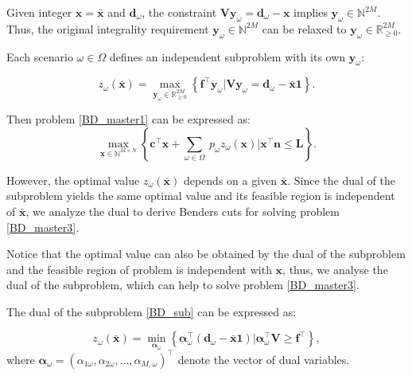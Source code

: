 Given integer $\mathbf{x} = \mathbf{\bar{x}}$ and $\mathbf{d}_{\omega}$, the constraint $\mathbf{V} \mathbf{y}_{\omega} = \mathbf{d}_{\omega} -\mathbf{x}$ implies $\mathbf{y}_{\omega} \in \mathbb{N}^{2M}$. Thus, the original integrality requirement $\mathbf{y}_{\omega} \in \mathbb{N}^{2M}$ can be relaxed to $\mathbf{y}_{\omega} \in \mathbb{R}^{2M}_{\scriptscriptstyle \geq 0}$.

Each scenario $\omega \in \Omega$ defines an independent subproblem with its own $\mathbf{y}_{\omega}$:

\begin{equation}\label{BD_sub}
  z_{\omega}(\mathbf{\bar{x}}) = \max_{\mathbf{y}_{\omega} \in \mathbb{R}^{2M}_{\scriptscriptstyle \geq 0}} \left\{
  \mathbf{f}^{\intercal} \mathbf{y}_{\omega}\Big| \mathbf{V} \mathbf{y}_{\omega} = \mathbf{d}_{\omega} - \mathbf{\bar{x}} \mathbf{1}
  \right\}.
\end{equation}

Then problem \eqref{BD_master1} can be expressed as:
\begin{equation}\label{BD_master3}
  \max_{\mathbf{x} \in \mathbb{N}^{M \times N}} \left\{ \mathbf{c}^{\intercal} \mathbf{x} + \sum_{\omega \in \Omega} ~ p_{\omega} z_{\omega}(\mathbf{x}) \bigg| \mathbf{x}^{\intercal} \mathbf{n} \leq \mathbf{L} \right\}.
\end{equation}


However, the optimal value $z_{\omega}(\mathbf{\bar{x}})$ depends on a given $\mathbf{\bar{x}}$. Since the dual of the subproblem yields the same optimal value and its feasible region is independent of $\mathbf{\bar{x}}$, we analyze the dual to derive Benders cuts for solving problem \eqref{BD_master3}.


Notice that the optimal value can also be obtained by the dual of the subproblem and the feasible region of problem is independent with $\mathbf{x}$, thus, we analyse the dual of the subproblem, which can help to solve problem \eqref{BD_master3}.


The dual of the subproblem \eqref{BD_sub} can be expressed as:

\begin{equation}\label{BD_sub_dual}
  z_{\omega}(\mathbf{\bar{x}}) = \min_{\bm{\alpha}_{\omega}} \left\{
    \bm{\alpha}_{\omega}^{\intercal} (\mathbf{d}_{\omega}- \mathbf{\bar{x}} \mathbf{1})\Big| \bm{\alpha}_{\omega}^{\intercal} \mathbf{V} \geq \mathbf{f}^{\intercal}
  \right\},
\end{equation}
where $\bm{\alpha}_{\omega} = (\alpha_{1\omega},\alpha_{2\omega}, \ldots, \alpha_{M,\omega})^{\intercal}$ denote the vector of dual variables. 

